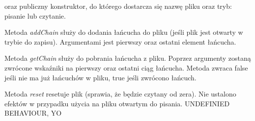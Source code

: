 \documentclass[a4paper,11pt]{article}
\begin{document}
oraz publiczny konstruktor, do którego dostarcza się nazwę pliku oraz tryb: pisanie lub czytanie.

Metoda \emph{addChain} służy do dodania łańcucha do pliku (jeśli plik jest otwarty w trybie do zapisu). Argumentami jest pierwszy oraz ostatni element łańcucha.

Metoda \emph{getChain} służy do pobrania łańcucha z pliku. Poprzez argumenty zostaną zwrócone wskaźniki na pierwszy oraz ostatni ciąg łańcucha. Metoda zwraca false jeśli nie ma już łańcuchów w pliku, true jeśli zwrócono łańcuch.

Metoda \emph{reset} resetuje plik (sprawia, że będzie czytany od zera). Nie ustalono efektów w przypadku użycia na pliku otwartym do pisania. \Large{UNDEFINIED BEHAVIOUR, YO}
\end{document}

